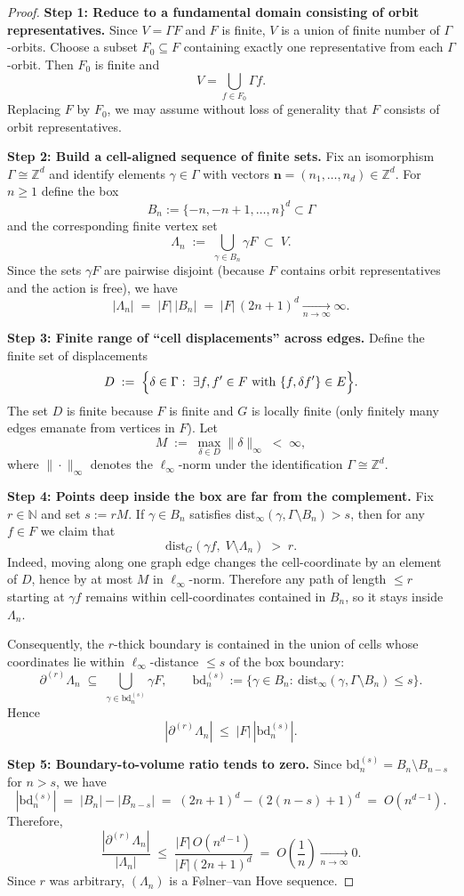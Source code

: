 \documentclass[10pt,a4paper]{amsart}
\begin{document}
\begin{proof}
\textbf{Step 1: Reduce to a fundamental domain consisting of orbit representatives.}
Since $V=\Gamma F$ and $F$ is finite, $V$ is a union of finite number of $\Gamma$-orbits.
Choose a subset $F_0\subseteq F$ containing exactly one representative from each $\Gamma$-orbit.
Then $F_0$ is finite and
\[
V=\bigcup_{f\in F_0}\Gamma f.
\]
Replacing $F$ by $F_0$, we may assume without loss of generality that $F$ consists of orbit
representatives.

\smallskip
\textbf{Step 2: Build a cell-aligned sequence of finite sets.}
Fix an isomorphism $\Gamma\cong \mathbb{Z}^d$ and identify elements $\gamma\in\Gamma$ with vectors
$\mathbf{n}=(n_1,\dots,n_d)\in\mathbb{Z}^d$. For $n\ge 1$ define the box
\[
B_n:=\{-n,-n+1,\dots,n\}^d\subset \Gamma
\]
and the corresponding finite vertex set
\[
\Lambda_n \;:=\; \bigcup_{\gamma\in B_n} \gamma F \;\subset\; V.
\]
Since the sets $\gamma F$ are pairwise disjoint (because $F$ contains orbit representatives and
the action is free), we have
\[
|\Lambda_n| \;=\; |F|\,|B_n| \;=\; |F|\,(2n+1)^d \xrightarrow[n\to\infty]{}\infty.
\]

\smallskip
\textbf{Step 3: Finite range of ``cell displacements'' across edges.}
Define the finite set of displacements
\[
D\;:=\;\Bigl\{\delta\in\Gamma:\ \exists f,f'\in F \text{ with } \{f,\delta f'\}\in E\Bigr\}.
\]
The set $D$ is finite because $F$ is finite and $G$ is locally finite (only finitely many edges
emanate from vertices in $F$). Let
\[
M \;:=\; \max_{\delta\in D}\|\delta\|_\infty \;<\;\infty,
\]
where $\|\cdot\|_\infty$ denotes the $\ell_\infty$-norm under the identification $\Gamma\cong\mathbb{Z}^d$.

\smallskip
\textbf{Step 4: Points deep inside the box are far from the complement.}
Fix $r\in\mathbb{N}$ and set $s:=rM$. If $\gamma\in B_n$ satisfies
$\mathrm{dist}_\infty(\gamma,\Gamma\setminus B_n)>s$, then for any $f\in F$ we claim that
\[
\mathrm{dist}_G(\gamma f,\; V\setminus \Lambda_n) \;>\; r.
\]
Indeed, moving along one graph edge changes the cell-coordinate by an element of $D$, hence by
at most $M$ in $\ell_\infty$-norm. Therefore any path of length $\le r$ starting at $\gamma f$
remains within cell-coordinates contained in $B_n$, so it stays inside $\Lambda_n$.

Consequently, the $r$-thick boundary is contained in the union of cells whose coordinates lie
within $\ell_\infty$-distance $\le s$ of the box boundary:
\[
\partial^{(r)}\Lambda_n \;\subseteq\; \bigcup_{\gamma\in \mathrm{bd}_n^{(s)}} \gamma F,
\qquad
\mathrm{bd}_n^{(s)}:=\{\gamma\in B_n:\ \mathrm{dist}_\infty(\gamma,\Gamma\setminus B_n)\le s\}.
\]
Hence
\[
|\partial^{(r)}\Lambda_n|
\;\le\;
|F|\,|\mathrm{bd}_n^{(s)}|.
\]

\smallskip
\textbf{Step 5: Boundary-to-volume ratio tends to zero.}
Since $\mathrm{bd}_n^{(s)} = B_n\setminus B_{n-s}$ for $n>s$, we have
\[
|\mathrm{bd}_n^{(s)}|
\;=\;
|B_n|-|B_{n-s}|
\;=\;
(2n+1)^d - (2(n-s)+1)^d
\;=\; O(n^{d-1}).
\]
Therefore,
\[
\frac{|\partial^{(r)}\Lambda_n|}{|\Lambda_n|}
\;\le\;
\frac{|F|\,O(n^{d-1})}{|F|(2n+1)^d}
\;=\; O\!\left(\frac{1}{n}\right)\xrightarrow[n\to\infty]{}0.
\]
Since $r$ was arbitrary, $(\Lambda_n)$ is a Følner--van Hove sequence.
\end{proof}
\end{document}
